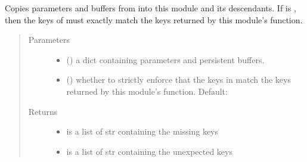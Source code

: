 \documentclass[letterpaper,10pt,english]{sphinxmanual}
\begin{document}
\begin{fulllineitems}
\begin{fulllineitems}
\label{\detokenize{api/dynamics:geology.metamodelling.dynamics.NeuralDifferentialEquation.load_state_dict}}
Copies parameters and buffers from {\hyperref[\detokenize{api/dynamics:geology.metamodelling.dynamics.NeuralDifferentialEquation.state_dict}]{}} into
this module and its descendants. If  is , then
the keys of {\hyperref[\detokenize{api/dynamics:geology.metamodelling.dynamics.NeuralDifferentialEquation.state_dict}]{}} must exactly match the keys returned
by this module’s  function.
\begin{quote}\begin{description}
\item[{Parameters}] \leavevmode\begin{itemize}
\item {} 
 () \textendash{} a dict containing parameters and
persistent buffers.

\item {} 
 (\sphinxstyleliteralemphasis{\sphinxupquote{, }}) \textendash{} whether to strictly enforce that the keys
in {\hyperref[\detokenize{api/dynamics:geology.metamodelling.dynamics.NeuralDifferentialEquation.state_dict}]{}} match the keys returned by this module’s
 function. Default: 

\end{itemize}

\item[{Returns}] \leavevmode
\begin{itemize}
\item {} 
 is a list of str containing the missing keys

\item {} 
 is a list of str containing the unexpected keys


\end{itemize}
\end{description}
\end{quote}
\end{fulllineitems}
\end{fulllineitems}
\end{document}
